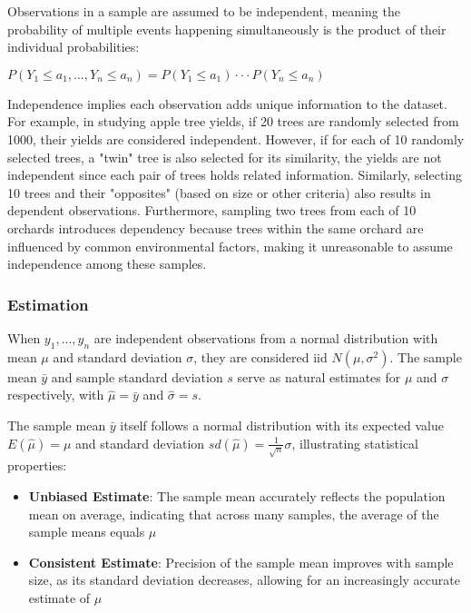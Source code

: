 \documentclass{article}
\begin{document}
Observations in a sample are assumed to be independent, meaning the probability of multiple events happening simultaneously is the product of their individual probabilities:

$P(Y_1 \leq a_1, ..., Y_n \leq a_n) = P(Y_1 \leq a_1) \cdot \cdot \cdot P(Y_n \leq a_n)$

Independence implies each observation adds unique information to the dataset. For example, in studying apple tree yields, if 20 trees are randomly selected from 1000, their yields are considered independent. However, if for each of 10 randomly selected trees, a "twin" tree is also selected for its similarity, the yields are not independent since each pair of trees holds related information. Similarly, selecting 10 trees and their "opposites" (based on size or other criteria) also results in dependent observations. Furthermore, sampling two trees from each of 10 orchards introduces dependency because trees within the same orchard are influenced by common environmental factors, making it unreasonable to assume independence among these samples.

\subsubsection{Estimation}

When $y_1, ..., y_n$ are independent observations from a normal distribution with mean $\mu$ and standard deviation $\sigma$, they are considered iid $N(\mu, \sigma^2)$. The sample mean $\bar y$ and sample standard deviation $s$ serve as natural estimates for $\mu$ and $\sigma$ respectively, with $\hat \mu = \bar y$ and $\hat \sigma = s$.

The sample mean $\bar y$ itself follows a normal distribution with its expected value $E(\hat \mu) = \mu$ and standard deviation $sd(\hat \mu) = \frac {1} {\sqrt{n}} \sigma$, illustrating statistical properties:

\begin{itemize}
    \item \textbf{Unbiased Estimate}: The sample mean accurately reflects the population mean on average, indicating that across many samples, the average of the sample means equals $\mu$
    \item \textbf{Consistent Estimate}: Precision of the sample mean improves with sample size, as its standard deviation decreases, allowing for an increasingly accurate estimate of $\mu$
\end{itemize}
\end{document}
